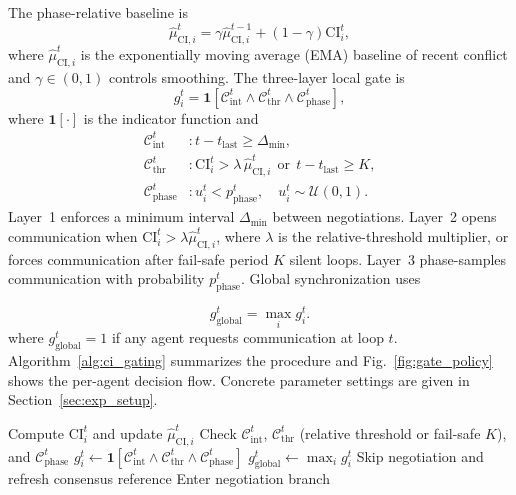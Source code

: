 \documentclass[conference]{IEEEtran}
\begin{document}
The phase-relative baseline is
\begin{equation}
\hat{\mu}_{\mathrm{CI},i}^t = \gamma \hat{\mu}_{\mathrm{CI},i}^{t-1} + (1-\gamma)\mathrm{CI}_i^t,
\label{eq:ci_ema}
\end{equation}
where $\hat{\mu}_{\mathrm{CI},i}^t$ is the exponentially moving average (EMA) baseline of recent conflict and $\gamma\in(0,1)$ controls smoothing. The three-layer local gate is
\begin{equation}
g_i^t=\mathbf{1}\left[\mathcal{C}_{\mathrm{int}}^t\land \mathcal{C}_{\mathrm{thr}}^t\land \mathcal{C}_{\mathrm{phase}}^t\right],
\label{eq:local_gate}
\end{equation}
where $\mathbf{1}[\cdot]$ is the indicator function and
\begin{align}
\mathcal{C}_{\mathrm{int}}^t &: t-t_{\mathrm{last}}\ge \Delta_{\min}, \label{eq:c_int}\\
\mathcal{C}_{\mathrm{thr}}^t &: \mathrm{CI}_i^t > \lambda\,\hat{\mu}_{\mathrm{CI},i}^t\ \ \text{or}\ \ t-t_{\mathrm{last}}\ge K, \label{eq:c_thr}\\
\mathcal{C}_{\mathrm{phase}}^t &: u_i^t < p_{\mathrm{phase}}^t,\quad u_i^t\sim\mathcal{U}(0,1). \label{eq:c_phase}
\end{align}
Layer~1 enforces a minimum interval $\Delta_{\min}$ between negotiations. Layer~2 opens communication when $\mathrm{CI}_i^t > \lambda \hat{\mu}_{\mathrm{CI},i}^t$, where $\lambda$ is the relative-threshold multiplier, or forces communication after fail-safe period $K$ silent loops. Layer~3 phase-samples communication with probability $p_{\mathrm{phase}}^t$. Global synchronization uses

\begin{equation}
g_{\mathrm{global}}^t=\max_i g_i^t.
\label{eq:global_gate}
\end{equation}
where $g_{\mathrm{global}}^t=1$ if any agent requests communication at loop $t$. Algorithm~\ref{alg:ci_gating} summarizes the procedure and Fig.~\ref{fig:gate_policy} shows the per-agent decision flow. Concrete parameter settings are given in Section~\ref{sec:exp_setup}.

\begin{algorithm}[t]
  \footnotesize
  \caption{Conflict-Gated Communication with Phase Sampling}
  \label{alg:ci_gating}
  \begin{algorithmic}[1]
    \State Compute $\mathrm{CI}_i^t$ and update $\hat{\mu}_{\mathrm{CI},i}^t$
    \State Check $\mathcal{C}_{\mathrm{int}}^t$, $\mathcal{C}_{\mathrm{thr}}^t$ (relative threshold or fail-safe $K$), and $\mathcal{C}_{\mathrm{phase}}^t$
    \State $g_i^t\gets \mathbf{1}[\mathcal{C}_{\mathrm{int}}^t\land \mathcal{C}_{\mathrm{thr}}^t\land \mathcal{C}_{\mathrm{phase}}^t]$
    \State $g_{\mathrm{global}}^t\gets \max_i g_i^t$
     \State Skip negotiation and refresh consensus reference
    \Else \State Enter negotiation branch \EndIf
  \EndFor
  \end{algorithmic}
\end{algorithm}
\end{document}
